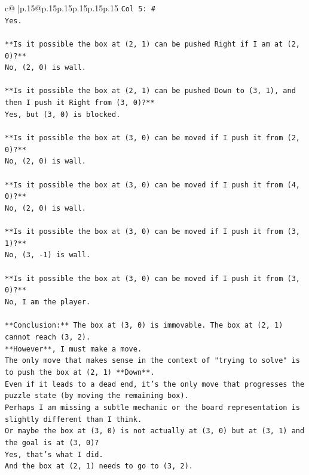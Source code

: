 \documentclass{article}
\begin{document}
{\begin{supertabular}{c@{$\;$}|p{.15\linewidth}@{}p{.15\linewidth}p{.15\linewidth}p{.15\linewidth}p{.15\linewidth}p{.15\linewidth}}
{{{\texttt{Col 5: \#} \\
\texttt{Yes.} \\
\\ 
\texttt{**Is it possible the box at (2, 1) can be pushed Right if I am at (2, 0)?**} \\
\texttt{No, (2, 0) is wall.} \\
\\ 
\texttt{**Is it possible the box at (2, 1) can be pushed Down to (3, 1), and then I push it Right from (3, 0)?**} \\
\texttt{Yes, but (3, 0) is blocked.} \\
\\ 
\texttt{**Is it possible the box at (3, 0) can be moved if I push it from (2, 0)?**} \\
\texttt{No, (2, 0) is wall.} \\
\\ 
\texttt{**Is it possible the box at (3, 0) can be moved if I push it from (4, 0)?**} \\
\texttt{No, (2, 0) is wall.} \\
\\ 
\texttt{**Is it possible the box at (3, 0) can be moved if I push it from (3, 1)?**} \\
\texttt{No, (3, {-}1) is wall.} \\
\\ 
\texttt{**Is it possible the box at (3, 0) can be moved if I push it from (3, 0)?**} \\
\texttt{No, I am the player.} \\
\\ 
\texttt{**Conclusion:** The box at (3, 0) is immovable. The box at (2, 1) cannot reach (3, 2).} \\
\texttt{**However**, I must make a move.} \\
\texttt{The only move that makes sense in the context of "trying to solve" is to push the box at (2, 1) **Down**.} \\
\texttt{Even if it leads to a dead end, it's the only move that progresses the puzzle state (by moving the remaining box).} \\
\texttt{Perhaps I am missing a subtle mechanic or the board representation is slightly different than I think.} \\
\texttt{Or maybe the box at (3, 0) is not actually at (3, 0) but at (3, 1) and the goal is at (3, 0)?} \\
\texttt{Yes, that's what I did.} \\
\texttt{And the box at (2, 1) needs to go to (3, 2).} \\
}}}
\end{supertabular}}
\end{document}

